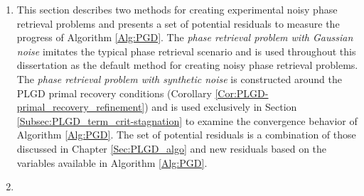 \begin{enumerate}


\item


This section describes two methods for creating experimental noisy phase retrieval problems and presents a set of potential residuals to measure the progress of Algorithm \ref{Alg:PGD}.
The \textit{phase retrieval problem with Gaussian noise} imitates the typical phase retrieval scenario and is used throughout this dissertation as the default method for creating noisy phase retrieval problems.
The \textit{phase retrieval problem with synthetic noise} is constructed around the PLGD primal recovery conditions (Corollary \ref{Cor:PLGD-primal_recovery_refinement}) and is used exclusively in Section \ref{Subsec:PLGD_term_crit-stagnation} to examine the convergence behavior of Algorithm \ref{Alg:PGD}.
The set of potential residuals is a combination of those discussed in Chapter \ref{Sec:PLGD_algo} and new residuals based on the variables available in Algorithm \ref{Alg:PGD}. 










\item



\end{enumerate}
